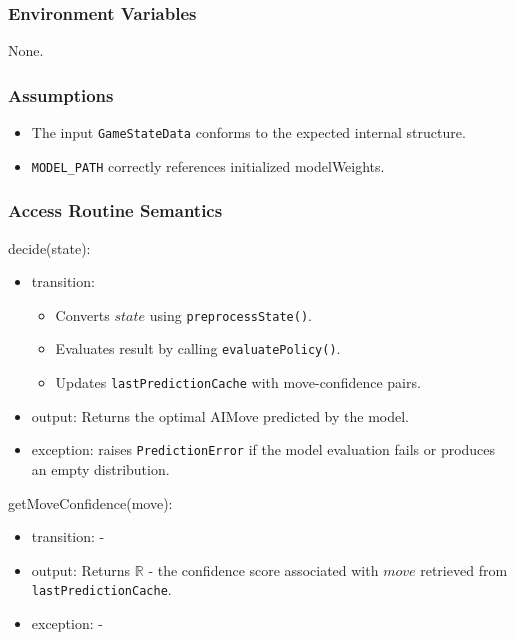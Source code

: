 \documentclass[12pt, titlepage]{article}
\begin{document}
\subsubsection{Environment Variables}
None.

\subsubsection{Assumptions}
\begin{itemize}
    \item The input \texttt{GameStateData} conforms to the expected internal structure.
    \item \texttt{MODEL\_PATH} correctly references initialized modelWeights.
\end{itemize}

\subsubsection{Access Routine Semantics}

\noindent decide(state):
\begin{itemize}
\item transition:
    \begin{itemize}
        \item Converts $state$ using \texttt{preprocessState()}.
        \item Evaluates result  by calling \texttt{evaluatePolicy()}.
        \item Updates \texttt{lastPredictionCache} with move-confidence pairs.
    \end{itemize}

\item output:  
      Returns the optimal AIMove predicted by the model.

\item exception:  
      raises \texttt{PredictionError} if the model evaluation fails or produces an empty distribution.
\end{itemize}

\noindent getMoveConfidence(move):
\begin{itemize}
\item transition: -
\item output:  
      Returns $\mathbb{R}$ - the confidence score associated with $move$  
      retrieved from \texttt{lastPredictionCache}.
\item exception: -
\end{itemize}
\end{document}
